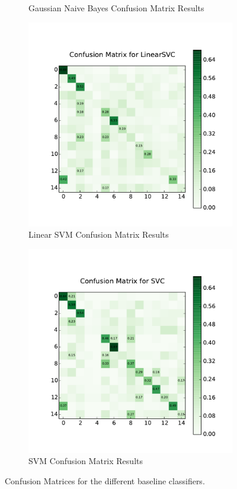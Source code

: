 \begin{figure}
\begin{subfigure}[b]{0.45\linewidth}
		\caption{Gaussian Naive Bayes Confusion Matrix Results}
	\end{subfigure}
	\hfill
	\begin{subfigure}[b]{0.45\linewidth}
		\centering
		\includegraphics[width=\linewidth]{images/baseline/cm_linear_svm.pdf}
		\caption{Linear SVM Confusion Matrix Results}
	\end{subfigure}
	\hfill
	\begin{subfigure}[b]{0.45\linewidth}
		\centering
		\includegraphics[width=\linewidth]{images/baseline/cm_svm.pdf}
		\caption{SVM Confusion Matrix Results}
	\end{subfigure}
	\caption{Confusion Matrices for the different baseline classifiers.}
	\label{baselines}
\end{figure}
